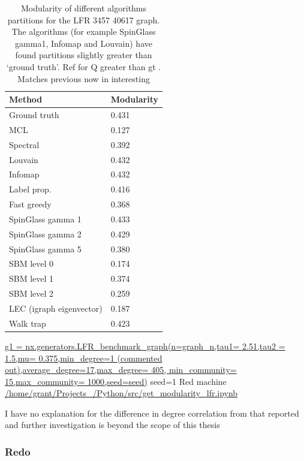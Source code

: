 \begin{table}[]
    \centering
    \setlength{\extrarowheight}{2pt}
 \begin{tabular}{ll}
\toprule
Method &  Modularity \\
\midrule
Ground truth        &       0.431 \\
MCL       &       0.127 \\ 
Spectral        &       0.392 \\
Louvain   &       0.432 \\
Infomap    &       0.432 \\
Label prop. &       0.416 \\
Fast greedy         &       0.368 \\
SpinGlass gamma 1        &       0.433 \\
SpinGlass gamma 2       &       0.429 \\
 SpinGlass gamma 5      &       0.380 \\
SBM level 0      &       0.174 \\
SBM level 1       &       0.374 \\
SBM level 2       &       0.259 \\
LEC (igraph eigenvector)        &       0.187 \\
Walk trap         &       0.423 \\
\bottomrule
\end{tabular}
    
    \caption{Modularity of different algorithms partitions for the LFR 3457 40617 graph. The algorithms (for example SpinGlass gamma1, Infomap and Louvain) have found partitions slightly greater than `ground truth'. Ref for Q greater than gt \cite{danon2006effect}. Matches previous now in interesting}
    \tiny\url{g1 = nx.generators.LFR_benchmark_graph(n=graph_n,tau1= 2.51,tau2 = 1.5,mu= 0.375,min_degree=1 (commented out),average_degree=17,max_degree= 405, min_community= 15,max_community= 1000,seed=seed)} seed=1
    \tiny Red machine
    \tiny\url{/home/grant/Projects_/Python/src/get_modularity_lfr.ipynb}
    \label{tab:modularity for the LFR 3457 40617 graph}
\end{table}

I have no explanation for the difference in degree correlation from that reported\cite{orman2009comparison} and further investigation is beyond the scope of this thesis
\subsubsection{Redo}

